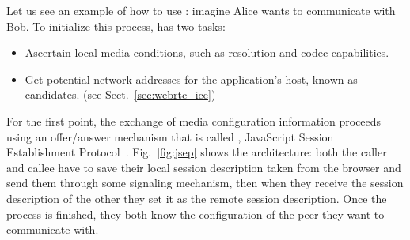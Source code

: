 Let us see an example of how to use \RTCPeerConnection: imagine Alice wants to communicate with Bob. To initialize this process, \RTCPeerConnection has two tasks:
\begin{itemize}
	\item Ascertain local media conditions, such as resolution and codec capabilities.
	\item Get potential network addresses for the application's host, known as candidates. (see Sect.~\ref{sec:webrtc_ice})
\end{itemize}

For the first point, the exchange of media configuration information proceeds using an offer/answer mechanism that is called \JSEP, JavaScript Session Establishment Protocol~\cite{jsep}. Fig.~\ref{fig:jsep} shows the \JSEP architecture: both the caller and callee have to save their local session description taken from the browser and send them through some signaling mechanism, then when they receive the session description of the other they set it as the remote session description. Once the process is finished, they both know the configuration of the peer they want to communicate with.

